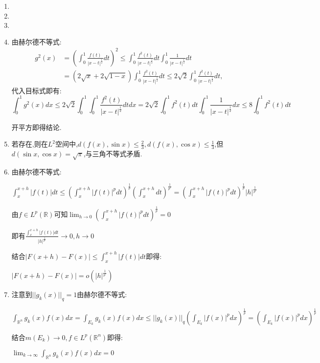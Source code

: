 \documentclass[UTF8, a4paper, 12pt, oneside, onecolumn]{article}
\numberwithin{equation}{section}
\numberwithin{figure}{section}
\numberwithin{table}{section}
\theoremstyle{nonumberplain}	%
\theoremstyle{plain}	%
\theoremstyle{plain}	%
\theoremstyle{plain}	%
\theoremstyle{plain}	%
\theoremstyle{nonumberplain}
\begin{document}
\begin{enumerate}
	\item 
	\item 
	\item 
	\item 由赫尔德不等式:
	\begin{align*}
		\displaystyle g^2(x) &=(\int_0^1\frac{f(t)}{|x-t|^{\frac{1}{2}}}dt)^2\leqslant \int_0^1\frac{f^2(t)}{|x-t|^{\frac{1}{2}}}dt\int_0^1\frac{1}{|x-t|^{\frac{1}{2}}}dt\\
		&=(2\sqrt{x}+2\sqrt{1-x})\int_0^1\frac{f^2(t)}{|x-t|^{\frac{1}{2}}}dt\leqslant2\sqrt2\int_0^1\frac{f^2(t)}{|x-t|^{\frac{1}{2}}}dt,
	\end{align*}
	代入目标式即有:
	$$\displaystyle\int_0^1 g^2(x)dx\leqslant2\sqrt2\int_0^1 \int_0^1\frac{f^2(t)}{|x-t|^{\frac{1}{2}}}dtdx=2\sqrt2\int_0^1 f^2(t)dt\int_0^1\frac{1}{|x-t|^{\frac{1}{2}}}dx\leqslant 8\int_0^1 f^2(t)dt$$
	
	开平方即得结论.
	\item 若存在,则在$L^2$空间中,$d(f(x),\sin{x})\leqslant\frac{2}{3},d(f(x),\cos{x})\leqslant\frac{1}{3}$,但$d(\sin{x},\cos{x})=\sqrt\pi$,与三角不等式矛盾.
	\item 由赫尔德不等式:
	
	$\displaystyle\int_{x}^{x+h}|f(t)|dt\leqslant(\int_{x}^{x+h}|f(t)|^pdt)^{\frac{1}{p}}(\int_{x}^{x+h}dt)^{\frac{1}{p'} }= (\int_{x}^{x+h}|f(t)|^pdt)^{\frac{1}{p}}|h|^{\frac{1}{p'} }$
	
	由$f\in L^p(\mathbb{R})$可知$\displaystyle\lim_{h\rightarrow 0}(\int_{x}^{x+h}|f(t)|^pdt)^{\frac{1}{p}}=0$
	
	即有$\displaystyle\frac{\int_{x}^{x+h}|f(t)|dt}{|h|^{\frac{1}{p'} }}\rightarrow 0,h\rightarrow 0 $ 
	
	结合$\displaystyle |F(x+h)-F(x)|\leqslant \int_{x}^{x+h}|f(t)|dt$即得:
		
	$|F(x+h)-F(x)|=o(|h|^{\frac{1}{p'} })$
	\item 注意到$||g_k(x)||_q=1$由赫尔德不等式:
	
	$\displaystyle\int_{\mathbb{R}^n}g_k(x)f(x)dx=\int_{E_k}g_k(x)f(x)dx\leqslant ||g_k(x)||_q(\int_{E_k}|f(x)|^pdx)^{\frac{1}{p}}=(\int_{E_k}|f(x)|^pdx)^{\frac{1}{p}}$
	
	结合$m(E_k)\rightarrow 0,f\in L^p(\mathbb{R}^n) $即得:
	
	$\displaystyle\lim_{k\rightarrow \infty}\int_{\mathbb{R}^n}g_k(x)f(x)dx=0$
\end{enumerate}
\end{document}
